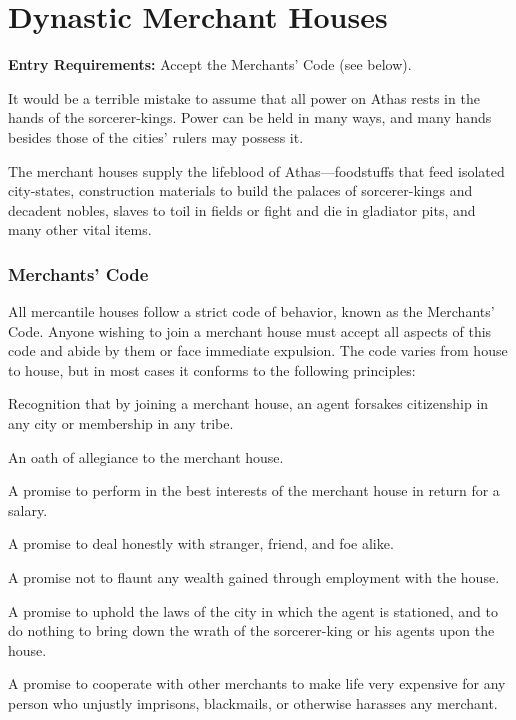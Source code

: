 \section{Dynastic Merchant Houses}

\textbf{Entry Requirements:} Accept the Merchants' Code (see below).

It would be a terrible mistake to assume that all power on Athas rests in the hands of the sorcerer-kings. Power can be held in many ways, and many hands besides those of the cities' rulers may possess it.

The merchant houses supply the lifeblood of Athas---foodstuffs that feed isolated city‐states, construction materials to build the palaces of sorcerer-kings and decadent nobles, slaves to toil in fields or fight and die in gladiator pits, and many other vital items.

\subsubsection{Merchants' Code}
All mercantile houses follow a strict code of behavior, known as the Merchants' Code. Anyone wishing to join a merchant house must accept all aspects of this code and abide by them or face immediate expulsion. The code varies from house to house, but in most cases it conforms to the following principles:

\begin{enumerate*}
\item Recognition that by joining a merchant house, an agent forsakes citizenship in any city or membership in any tribe.
\item An oath of allegiance to the merchant house.
\item A promise to perform in the best interests of the merchant house in return for a salary.
\item A promise to deal honestly with stranger, friend, and foe alike.
\item A promise not to flaunt any wealth gained through employment with the house.
\item A promise to uphold the laws of the city in which the agent is stationed, and to do nothing to bring down the wrath of the sorcerer-king or his agents upon the house.
\item A promise to cooperate with other merchants to make life very expensive for any person who unjustly imprisons, blackmails, or otherwise harasses any merchant.
\end{enumerate*}

